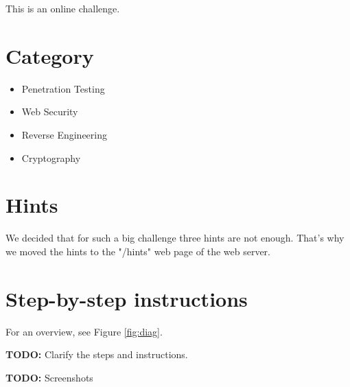 \documentclass[a4paper]{article}
\newcommand{\TODO}[1]{\begin{center}\large\textbf{TODO:} #1\end{center}}
\begin{document}
This is an online challenge.

\section{Category}

\begin{itemize}
  \item Penetration Testing
  \item Web Security
  \item Reverse Engineering
  \item Cryptography
\end{itemize}

\section{Hints}

We decided that for such a big challenge three hints are not enough. That's
why we moved the hints to the "/hints" web page of the web server.

\section{Step-by-step instructions}

For an overview, see Figure \ref{fig:diag}.

\TODO{Clarify the steps and instructions.}
\TODO{Screenshots}
\end{document}
